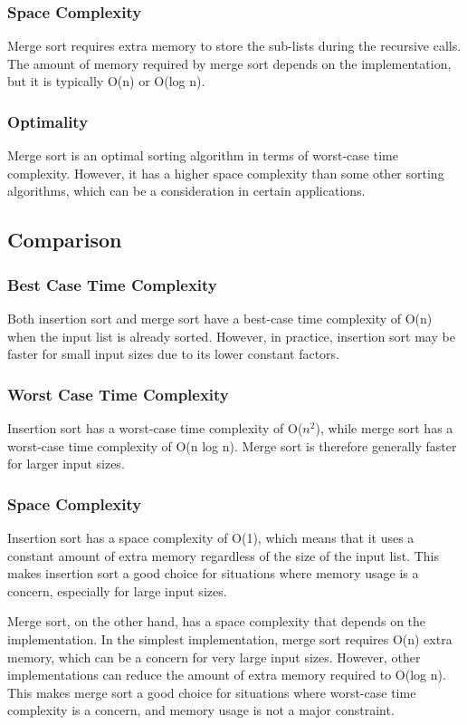 \documentclass[a4paper, 11pt, oneside]{book} %
\begin{document}
\subsubsection{Space Complexity}
Merge sort requires extra memory to store the sub-lists during the recursive calls. The amount of memory required by merge sort depends on the implementation, but it is typically O(n) or O(log n).

\subsubsection{Optimality}
Merge sort is an optimal sorting algorithm in terms of worst-case time complexity. However, it has a higher space complexity than some other sorting algorithms, which can be a consideration in certain applications.

\subsection{Comparison}
\subsubsection{Best Case Time Complexity}
Both insertion sort and merge sort have a best-case time complexity of O(n) when the input list is already sorted. However, in practice, insertion sort may be faster for small input sizes due to its lower constant factors.
\subsubsection{Worst Case Time Complexity}
Insertion sort has a worst-case time complexity of O($n^2$), while merge sort has a worst-case time complexity of O(n log n). Merge sort is therefore generally faster for larger input sizes.
\subsubsection{Space Complexity}
Insertion sort has a space complexity of O(1), which means that it uses a constant amount of extra memory regardless of the size of the input list. This makes insertion sort a good choice for situations where memory usage is a concern, especially for large input sizes.

Merge sort, on the other hand, has a space complexity that depends on the implementation. In the simplest implementation, merge sort requires O(n) extra memory, which can be a concern for very large input sizes. However, other implementations can reduce the amount of extra memory required to O(log n). This makes merge sort a good choice for situations where worst-case time complexity is a concern, and memory usage is not a major constraint.
\end{document}
